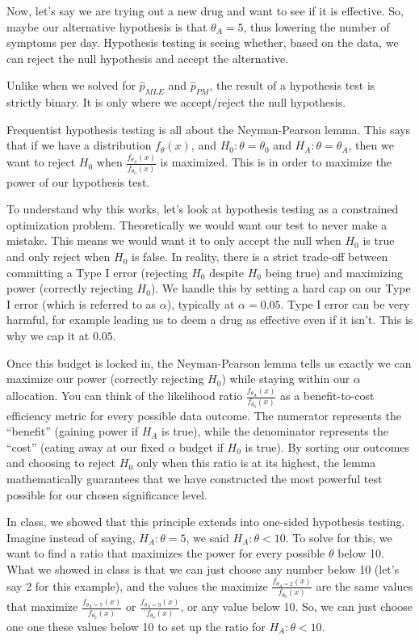 \documentclass[
  letterpaper,
  DIV=11,
  numbers=noendperiod]{scrreprt}
\begin{document}
Now, let's say we are trying out a new drug and want to see if it is
effective. So, maybe our alternative hypothesis is that
\(\theta_A = 5\), thus lowering the number of symptoms per day.
Hypothesis testing is seeing whether, based on the data, we can reject
the null hypothesis and accept the alternative.

Unlike when we solved for \(\hat{p}_{MLE}\) and \(\hat{p}_{PM}\), the
result of a hypothesis test is strictly binary. It is only where we
accept/reject the null hypothesis.

Frequentist hypothesis testing is all about the Neyman-Pearson lemma.
This says that if we have a distribution \(f_\theta(x)\), and
\(H_0: \theta = \theta_0\) and \(H_A: \theta = \theta_A\), then we want
to reject \(H_0\) when \(\frac{f_{\theta_A}(x)}{f_{\theta_0}(x)}\) is
maximized. This is in order to maximize the power of our hypothesis
test.

To understand why this works, let's look at hypothesis testing as a
constrained optimization problem. Theoretically we would want our test
to never make a mistake. This means we would want it to only accept the
null when \(H_0\) is true and only reject when \(H_0\) is false. In
reality, there is a strict trade-off between committing a Type I error
(rejecting \(H_0\) despite \(H_0\) being true) and maximizing power
(correctly rejecting \(H_0\)). We handle this by setting a hard cap on
our Type I error (which is referred to as \(\alpha\)), typically at
\(\alpha = 0.05\). Type I error can be very harmful, for example leading
us to deem a drug as effective even if it isn't. This is why we cap it
at \(0.05\).

Once this budget is locked in, the Neyman-Pearson lemma tells us exactly
we can maximize our power (correctly rejecting \(H_0\)) while staying
within our \(\alpha\) allocation. You can think of the likelihood ratio
\(\frac{f_{\theta_A}(x)}{f_{\theta_0}(x)}\) as a benefit-to-cost
efficiency metric for every possible data outcome. The numerator
represents the ``benefit'' (gaining power if \(H_A\) is true), while the
denominator represents the ``cost'' (eating away at our fixed \(\alpha\)
budget if \(H_0\) is true). By sorting our outcomes and choosing to
reject \(H_0\) only when this ratio is at its highest, the lemma
mathematically guarantees that we have constructed the most powerful
test possible for our chosen significance level.

In class, we showed that this principle extends into one-sided
hypothesis testing. Imagine instead of saying, \(H_A: \theta = 5\), we
said \(H_A: \theta < 10\). To solve for this, we want to find a ratio
that maximizes the power for every possible \(\theta\) below 10. What we
showed in class is that we can just choose any number below 10 (let's
say 2 for this example), and the values the maximize
\(\frac{f_{\theta_A = 2}(x)}{f_{\theta_0}(x)}\) are the same values that
maximize \(\frac{f_{\theta_A = 7}(x)}{f_{\theta_0}(x)}\) or
\(\frac{f_{\theta_A = 9}(x)}{f_{\theta_0}(x)}\), or any value below 10.
So, we can just choose one one these values below 10 to set up the ratio
for \(H_A: \theta < 10\).
\end{document}
